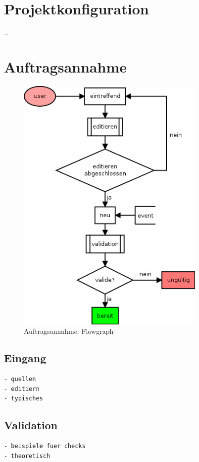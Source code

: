\section{Projektkonfiguration}


\ldots


\section{Auftragsannahme}


\begin{figure}[ht] 
  \label{fig:lebenszyklus-auftrag-eingang}
  \begin{center}
      \includegraphics[height=5in]{imageinput/lebenszyklus-auftrag-eingang.png}
  \end{center}
  \caption{Auftragsannahme: Flowgraph}
\end{figure}


\subsection{Eingang}

\begin{verbatim}
- quellen
- editiern
- typisches
\end{verbatim}

\subsection{Validation}
\begin{verbatim}
- beispiele fuer checks
- theoretisch
\end{verbatim}



